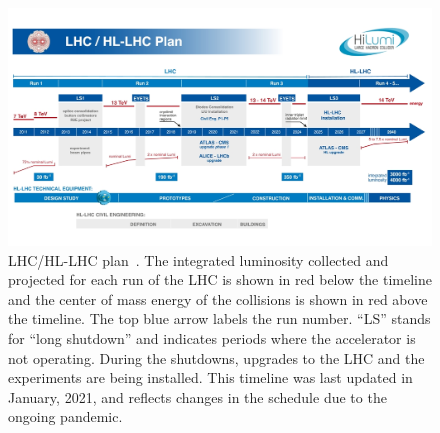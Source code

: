 \begin{figure}
    \centering
    \includegraphics[width = \textwidth]{figures/HL-LHC-updated-January-2021_small.jpg}
    \caption{LHC/HL-LHC plan~\cite{hl-lhc_plan_picture_website}. The integrated luminosity collected and projected for each run of the LHC is shown in red below the timeline and the center of mass energy of the collisions is shown in red above the timeline. The top blue arrow labels the run number. ``LS'' stands for ``long shutdown'' and indicates periods where the accelerator is not operating. During the shutdowns, upgrades to the LHC and the experiments are being installed. This timeline was last updated in January, 2021, and reflects changes in the schedule due to the ongoing pandemic. }
    \label{fig:hl-lhc}
\end{figure}



